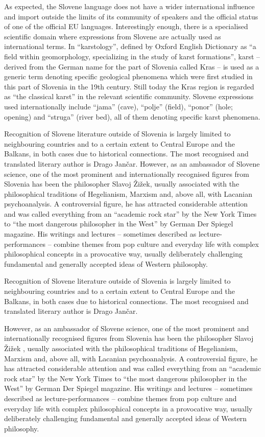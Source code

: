\begin{multicols}{2}
As expected, the Slovene language does not have a wider international influence and import outside the limits of its community of speakers and the official status of one of the official EU languages. Interestingly enough, there is a specialised scientific domain where expressions from Slovene are actually used as international terms. In ``karstology'', defined by Oxford English Dictionary as ``a field within geomorphology, specializing in the study of karst formations'', karst – derived from the German name for the part of Slovenia called Kras – is used as a generic term denoting specific geological phenomena which were first studied in this part of Slovenia in the 19th century. Still today the Kras region is regarded as ``the classical karst'' in the relevant scientific community. Slovene expressions used internationally include ``jama'' (cave), ``polje'' (field), ``ponor'' (hole; opening) and ``struga'' (river bed), all of them denoting specific karst phenomena.


Recognition of Slovene literature outside of Slovenia is largely limited to neighbouring countries and to a certain extent to Central Europe and the Balkans, in both cases due to historical connections. The most recognised and translated literary author is Drago Jančar. However, as an ambassador of Slovene science, one of the most prominent and internationally recognised figures from Slovenia has been the philosopher Slavoj Žižek, usually associated with the philosophical traditions of Hegelianism, Marxism and, above all, with Lacanian psychoanalysis. A controversial figure, he has attracted considerable attention and was called everything from an “academic rock star” by the New York Times to ``the most dangerous philosopher in the West'' by German Der Spiegel magazine. His writings and lectures – sometimes described as lecture-performances – combine themes from pop culture and everyday life with complex philosophical concepts in a provocative way, usually deliberately challenging fundamental and generally accepted ideas of Western philosophy. 

Recognition of Slovene literature outside of Slovenia is largely limited to neighbouring countries and to a certain extent to Central Europe and the Balkans, in both cases due to historical connections. The most recognised and translated literary author is Drago Jančar. 

However, as an ambassador of Slovene science, one of the most prominent and internationally recognised figures from Slovenia has been the philosopher Slavoj Žižek ,
usually associated with the philosophical traditions of Hegelianism, Marxism and, above all, with Lacanian psychoanalysis. A controversial figure, he has attracted considerable attention and was called everything from an “academic rock star” by the New York Times to ``the most dangerous philosopher in the West'' by German Der Spiegel magazine. His writings and lectures – sometimes described as lecture-performances – combine themes from pop culture and everyday life with complex philosophical concepts in a provocative way, usually deliberately challenging fundamental and generally accepted ideas of Western philosophy. 


\end{multicols}
